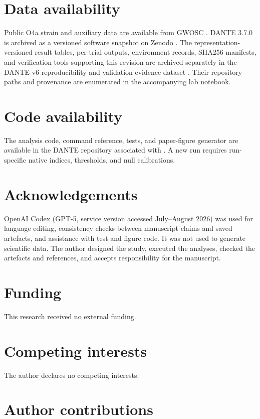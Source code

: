 \documentclass[aps,prd,twocolumn,superscriptaddress,nofootinbib,amsmath,amssymb,floatfix,10pt]{revtex4-2}
\begin{document}
\section*{Data availability}

Public O4a strain and auxiliary data are available from GWOSC
\cite{gwosc_aux_o4,gwosc_o4a_release}.  DANTE 3.7.0 is archived as a versioned
software snapshot on Zenodo \cite{dante_zenodo}.  The representation-versioned
result tables, per-trial outputs, environment records, SHA256 manifests, and
verification tools supporting this revision are archived separately in the
DANTE v6 reproducibility and validation evidence dataset
\cite{dante_v6_evidence}.  Their repository paths and provenance are enumerated
in the accompanying lab notebook.

\section*{Code availability}

The analysis code, command reference, tests, and paper-figure generator are
available in the DANTE repository associated with \cite{dante_zenodo}.  A new
run requires run-specific native indices, thresholds, and null calibrations.

\section*{Acknowledgements}

OpenAI Codex (GPT-5, service version accessed July--August 2026) was used for
language editing, consistency checks
between manuscript claims and saved artefacts, and assistance with test and
figure code.  It was not used to generate scientific data.  The author
designed the study, executed the analyses, checked the artefacts and
references, and accepts responsibility for the manuscript.

\section*{Funding}

This research received no external funding.

\section*{Competing interests}

The author declares no competing interests.

\section*{Author contributions}
\end{document}
